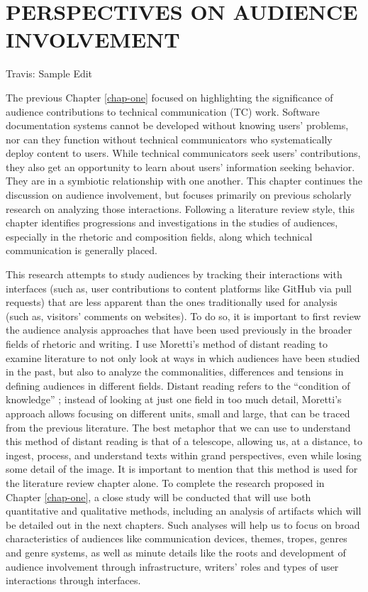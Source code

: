 \chapter{PERSPECTIVES ON AUDIENCE INVOLVEMENT}
\label{chap-two}

Travis: Sample Edit

The previous Chapter \ref{chap-one} focused on highlighting the significance of audience contributions to technical communication (TC) work. Software documentation systems cannot be developed without knowing users’ problems, nor can they function without technical communicators who systematically deploy content to users. While technical communicators seek users’ contributions, they also get an opportunity to learn about users’ information seeking behavior. They are in a symbiotic relationship with one another. This chapter continues the discussion on audience involvement, but focuses primarily on previous scholarly research on analyzing those interactions. Following a literature review style, this chapter identifies progressions and investigations in the studies of audiences, especially in the rhetoric and composition fields, along which technical communication is generally placed.

This research attempts to study audiences by tracking their interactions with interfaces (such as, user contributions to content platforms like GitHub via pull requests) that are less apparent than the ones traditionally used for analysis (such as, visitors’ comments on websites). To do so, it is important to first review the audience analysis approaches that have been used previously in the broader fields of rhetoric and writing. I use Moretti’s \cite{moretti2000conjectures} method of distant reading to examine literature to not only look at ways in which audiences have been studied in the past, but also to analyze the commonalities, differences and tensions in defining audiences in different fields. Distant reading refers to the “condition of knowledge” \cite{moretti2000conjectures}; instead of looking at just one field in too much detail, Moretti’s approach allows focusing on different units, small and large, that can be traced from the previous literature. The  best  metaphor  that  we  can  use  to understand this method of distant reading is that of a telescope, allowing us, at a distance, to ingest, process, and understand texts within grand perspectives, even while losing some detail of the image. It is important to mention that this method is used for the literature review chapter alone. To complete the research proposed in Chapter \ref{chap-one}, a close study will be conducted that will use both quantitative and qualitative methods, including an analysis of artifacts which will be detailed out in the next chapters. Such analyses will help us to focus on broad characteristics of audiences like communication devices, themes, tropes, genres and genre systems, as well as minute details like the roots and development of audience involvement through infrastructure, writers’ roles and types of user interactions through interfaces.


